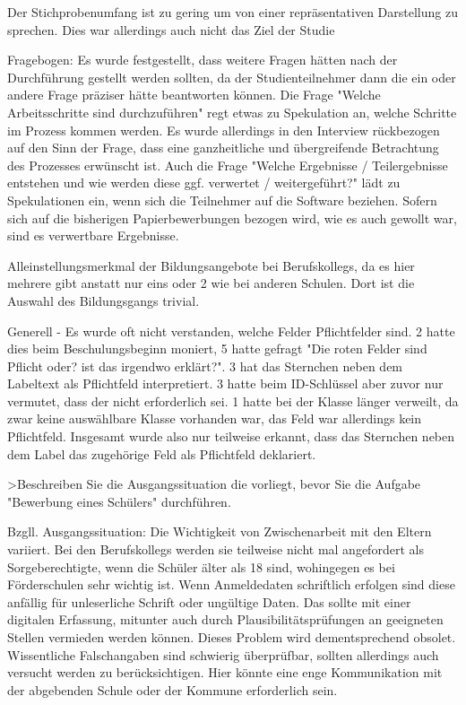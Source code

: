 Der Stichprobenumfang ist zu gering um von einer repräsentativen Darstellung zu sprechen. Dies war allerdings auch nicht das Ziel der Studie


Fragebogen: Es wurde festgestellt, dass weitere Fragen hätten nach der Durchführung gestellt werden sollten, da der Studienteilnehmer dann die ein oder andere Frage präziser hätte beantworten können.
Die Frage "Welche Arbeitsschritte sind durchzuführen" regt etwas zu Spekulation an, welche Schritte im Prozess kommen werden. Es wurde allerdings in den Interview rückbezogen auf den Sinn der Frage, dass eine ganzheitliche und übergreifende Betrachtung des Prozesses erwünscht ist.
Auch die Frage "Welche Ergebnisse / Teilergebnisse entstehen und wie werden diese ggf. verwertet / weitergeführt?" lädt zu Spekulationen ein, wenn sich die Teilnehmer auf die Software beziehen. Sofern sich auf die bisherigen Papierbewerbungen bezogen wird, wie es auch gewollt war, sind es verwertbare Ergebnisse.

Alleinstellungsmerkmal der Bildungsangebote bei Berufskollegs, da es hier mehrere gibt anstatt nur eins oder 2 wie bei anderen Schulen. Dort ist die Auswahl des Bildungsgangs trivial.

Generell
- Es wurde oft nicht verstanden, welche Felder Pflichtfelder sind. 2 hatte dies beim Beschulungsbeginn moniert, 5 hatte gefragt "Die roten Felder sind Pflicht oder? ist das irgendwo erklärt?". 3 hat das Sternchen neben dem Labeltext als Pflichtfeld interpretiert. 3 hatte beim ID-Schlüssel aber zuvor nur vermutet, dass der nicht erforderlich sei. 1 hatte bei der Klasse länger verweilt, da zwar keine auswählbare Klasse vorhanden war, das Feld war allerdings kein Pflichtfeld. Insgesamt wurde also nur teilweise  erkannt, dass das Sternchen neben dem Label das zugehörige Feld als Pflichtfeld deklariert.



>Beschreiben Sie die Ausgangssituation die vorliegt, bevor Sie die Aufgabe "Bewerbung eines Schülers" durchführen.


Bzgll. Ausgangssituation:
Die Wichtigkeit von Zwischenarbeit mit den Eltern variiert. Bei den Berufskollegs werden sie teilweise nicht mal angefordert als Sorgeberechtigte, wenn die Schüler älter als 18 sind, wohingegen es bei Förderschulen sehr wichtig ist.
Wenn Anmeldedaten schriftlich erfolgen sind diese anfällig für unleserliche Schrift oder ungültige Daten. Das sollte mit einer digitalen Erfassung, mitunter auch durch Plausibilitätsprüfungen an geeigneten Stellen vermieden werden können. Dieses Problem wird dementsprechend obsolet. Wissentliche Falschangaben sind schwierig überprüfbar, sollten allerdings auch versucht werden zu berücksichtigen. Hier könnte eine enge Kommunikation mit der abgebenden Schule oder der Kommune erforderlich sein.




